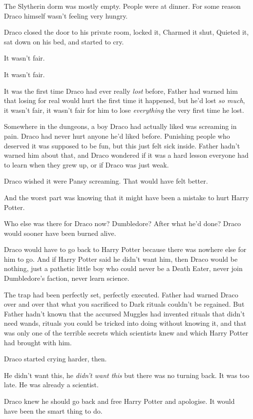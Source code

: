 The Slytherin dorm was mostly empty. People were at dinner. For some
reason Draco himself wasn't feeling very hungry.

Draco closed the door to his private room, locked it, Charmed it shut,
Quieted it, sat down on his bed, and started to cry.

It wasn't fair.

It wasn't fair.

It was the first time Draco had ever really \emph{lost} before, Father
had warned him that losing for real would hurt the first time it
happened, but he'd lost \emph{so much}, it wasn't fair, it wasn't fair
for him to lose \emph{everything} the very first time he lost.

Somewhere in the dungeons, a boy Draco had actually liked was screaming
in pain. Draco had never hurt anyone he'd liked before. Punishing people
who deserved it was supposed to be fun, but this just felt sick inside.
Father hadn't warned him about that, and Draco wondered if it was a hard
lesson everyone had to learn when they grew up, or if Draco was just
weak.

Draco wished it were Pansy screaming. That would have felt better.

And the worst part was knowing that it might have been a mistake to hurt
Harry Potter.

Who else was there for Draco now? Dumbledore? After what he'd done?
Draco would sooner have been burned alive.

Draco would have to go back to Harry Potter because there was nowhere
else for him to go. And if Harry Potter said he didn't want him, then
Draco would be nothing, just a pathetic little boy who could never be a
Death Eater, never join Dumbledore's faction, never learn science.

The trap had been perfectly set, perfectly executed. Father had warned
Draco over and over that what you sacrificed to Dark rituals couldn't be
regained. But Father hadn't known that the accursed Muggles had invented
rituals that didn't need wands, rituals you could be tricked into doing
without knowing it, and that was only one of the terrible secrets which
scientists knew and which Harry Potter had brought with him.

Draco started crying harder, then.

He didn't want this, he \emph{didn't want this} but there was no turning
back. It was too late. He was already a scientist.

Draco knew he should go back and free Harry Potter and apologise. It
would have been the smart thing to do.

